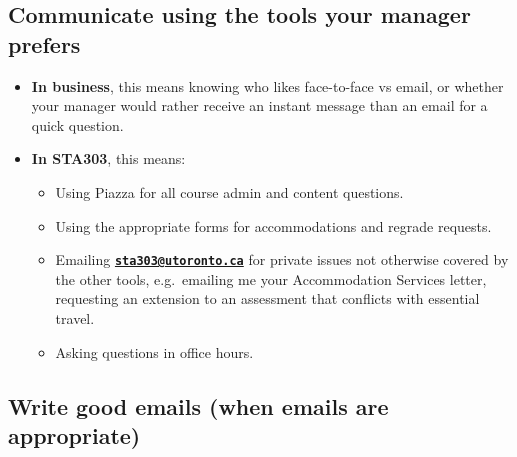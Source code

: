 \documentclass[
  openany]{book}
\providecommand{\tightlist}{%
  \setlength{\itemsep}{0pt}\setlength{\parskip}{0pt}}
\begin{document}
\hypertarget{communicate-using-the-tools-your-manager-prefers}{%
\subsection{Communicate using the tools your manager prefers}\label{communicate-using-the-tools-your-manager-prefers}}

\begin{itemize}
\tightlist
\item
  \textbf{In business}, this means knowing who likes face-to-face vs email, or whether your manager would rather receive an instant message than an email for a quick question.
\item
  \textbf{In STA303}, this means:

  \begin{itemize}
  \tightlist
  \item
    Using Piazza for all course admin and content questions.
  \item
    Using the appropriate forms for accommodations and regrade requests.
  \item
    Emailing \textbf{\href{mailto:sta303@utoronto.ca}{\nolinkurl{sta303@utoronto.ca}}} for private issues not otherwise covered by the other tools, e.g.~emailing me your Accommodation Services letter, requesting an extension to an assessment that conflicts with essential travel.
  \item
    Asking questions in office hours.
  \end{itemize}
\end{itemize}

\hypertarget{write-good-emails-when-emails-are-appropriate}{%
\subsection{Write good emails (when emails are appropriate)}\label{write-good-emails-when-emails-are-appropriate}}
\end{document}
